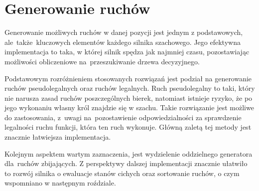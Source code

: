 \usepackage{biblatex}\section{Generowanie ruchów}
\label{sec:generowanie-ruchow}

Generowanie możliwych ruchów w danej pozycji jest jednym z podstawowych, ale~także~kluczowych elementów każdego silnika szachowego.
Jego efektywna implementacja to taka, w której silnik spędza jak najmniej czasu, pozostawiając możliwości obliczeniowe na~przeszukiwanie drzewa decyzyjnego.

Podstawowym rozróżnieniem stosowanych rozwiązań jest podział na generowanie ruchów pseudolegalnych oraz ruchów legalnych. \cite*{wiki-movegen}
Ruch pseudolegalny to taki, który nie narusza zasad ruchów poszczególnych bierek, natomiast istnieje ryzyko, że po jego wykonaniu własny król znajdzie się w szachu.
Takie rozwiązanie jest możliwe do zastosowania, z~uwagi na~pozostawienie odpowiedzialności za sprawdzenie legalności ruchu funkcji, która ten ruch wykonuje.
Główną zaletą tej metody jest znacznie łatwiejsza implementacja.

Kolejnym aspektem wartym zaznaczenia, jest wydzielenie oddzielnego generatora dla~ruchów zbijających.
Z perspektywy dalszej implementacji znacznie ułatwiło to rozwój silnika o ewaluacje stanów cichych oraz sortowanie ruchów, o czym wspomniano w następnym roździale.




